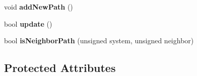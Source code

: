 \begin{DoxyCompactItemize}
\item 
void {\bfseries add\+New\+Path} ()\hypertarget{classNavPath_a268fa50e133db27d33acf607a0e59eb8}{}\label{classNavPath_a268fa50e133db27d33acf607a0e59eb8}

\item 
bool {\bfseries update} ()\hypertarget{classNavPath_ab253f2b9baf4f74eeaa82c2fe07dcc35}{}\label{classNavPath_ab253f2b9baf4f74eeaa82c2fe07dcc35}

\item 
bool {\bfseries is\+Neighbor\+Path} (unsigned system, unsigned neighbor)\hypertarget{classNavPath_a92d4544a8216c2143de21d15ef4bb286}{}\label{classNavPath_a92d4544a8216c2143de21d15ef4bb286}

\end{DoxyCompactItemize}
\subsection*{Protected Attributes}
